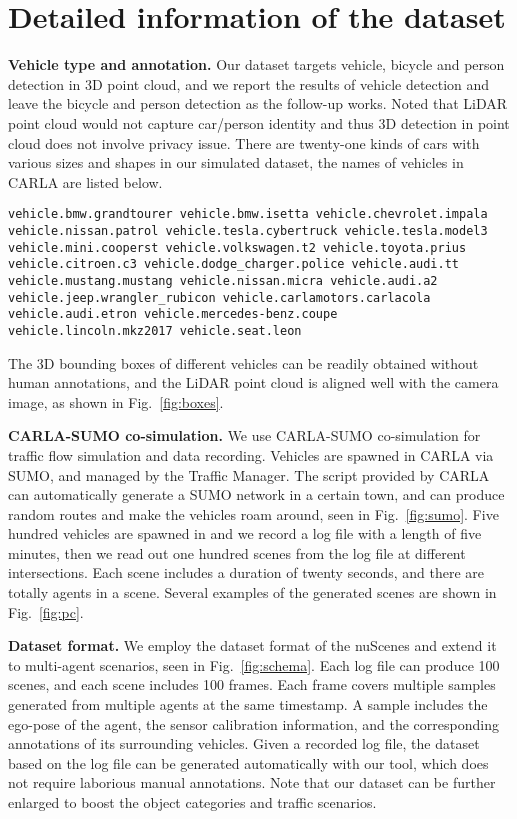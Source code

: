 \documentclass{article}
\begin{document}
\section{Detailed information of the dataset}
\textbf{Vehicle type and annotation.} Our dataset targets vehicle, bicycle and person detection in 3D point cloud, and we report the results of vehicle detection and leave the bicycle and person detection as the follow-up works. Noted that LiDAR point cloud would not capture car/person identity and thus 3D detection in point cloud does not involve privacy issue. There are twenty-one kinds of cars with various sizes and shapes in our simulated dataset, the names of vehicles in CARLA are listed below.
\begin{verbatim}
vehicle.bmw.grandtourer vehicle.bmw.isetta vehicle.chevrolet.impala
vehicle.nissan.patrol vehicle.tesla.cybertruck vehicle.tesla.model3
vehicle.mini.cooperst vehicle.volkswagen.t2 vehicle.toyota.prius
vehicle.citroen.c3 vehicle.dodge_charger.police vehicle.audi.tt 
vehicle.mustang.mustang vehicle.nissan.micra vehicle.audi.a2
vehicle.jeep.wrangler_rubicon vehicle.carlamotors.carlacola  
vehicle.audi.etron vehicle.mercedes-benz.coupe
vehicle.lincoln.mkz2017 vehicle.seat.leon
\end{verbatim}

The 3D bounding boxes of different vehicles can be readily obtained without human annotations, and the LiDAR point cloud is aligned well with the camera image, as shown in Fig.~\ref{fig:boxes}.				

\textbf{CARLA-SUMO co-simulation.} 
We use CARLA-SUMO co-simulation for traffic flow simulation and data recording. Vehicles are spawned in CARLA via SUMO, and managed by the Traffic Manager. The script  provided by CARLA can automatically generate a SUMO network in a certain town, and can produce random routes and make the vehicles roam around, seen in Fig.~\ref{fig:sumo}. Five hundred vehicles are spawned in  and we record a log file with a length of five minutes, then we read out one hundred scenes from the log file at different intersections. Each scene includes a duration of twenty seconds, and there are totally  agents in a scene. Several examples of the generated scenes are shown in Fig.~\ref{fig:pc}.

\textbf{Dataset format.}
We employ the dataset format of the nuScenes and extend it to multi-agent scenarios, seen in Fig.~\ref{fig:schema}. Each log file can produce 100 scenes, and each scene includes 100 frames. Each frame covers multiple samples generated from multiple agents at the same timestamp. A sample includes the ego-pose of the agent, the sensor calibration information, and the corresponding annotations of its surrounding vehicles. Given a recorded log file, the dataset based on the log file can be generated automatically with our tool, which does not require laborious manual annotations. Note that our dataset can be further enlarged to boost the object categories and traffic scenarios.
\end{document}
